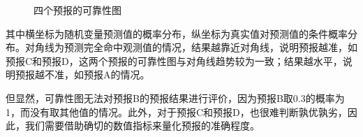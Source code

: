 \documentclass[a4paper,12pt,onecolumn,twoside]{article}
\begin{document}
\begin{figure}[H]
{	}
	\quad
	\quad
	\caption{四个预报的可靠性图}
\end{figure}
其中横坐标为随机变量预测值的概率分布，纵坐标为真实值对预测值的条件概率分布。对角线为预测完全命中观测值的情况，结果越靠近对角线，说明预报越准，如预报C和预报D，这两个预报的可靠性图与对角线趋势较为一致；结果越水平，说明预报越不准，如预报A的情况。\par
但显然，可靠性图无法对预报B的预报结果进行评价，因为预报B取0.3的概率为1，而没有取其他值的情况。此外，对于预报C和预报D，也很难判断孰优孰劣，因此，我们需要借助确切的数值指标来量化预报的准确程度。
\end{document}
